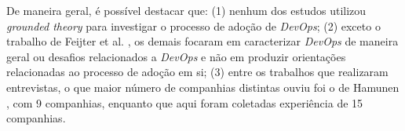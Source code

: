 De maneira geral, é possível destacar que: (1) nenhum dos estudos utilizou
{\it grounded theory} para investigar o processo de adoção de {\it DevOps};
(2) exceto o trabalho de Feijter et al. \cite{feijter2017towards}, os demais
focaram em caracterizar {\it DevOps} de maneira geral ou desafios relacionados
a {\it DevOps} e não em produzir orientações relacionadas ao processo de adoção
em si; (3) entre os trabalhos que realizaram entrevistas, o que maior número
de companhias distintas ouviu foi o de Hamunen \cite{challenges_in_adopting_devops},
com 9 companhias, enquanto que aqui foram coletadas experiência de 15 companhias.
